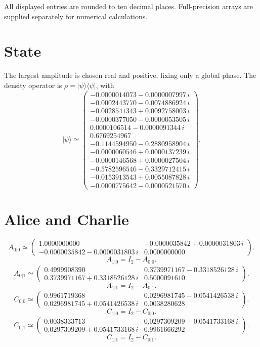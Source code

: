 \documentclass[11pt]{article}
\begin{document}
All displayed entries are rounded to ten decimal places. Full-precision
arrays are supplied separately for numerical calculations.
\section{State}
The largest amplitude is chosen real and positive, fixing only a global
phase. The density operator is $\rho=|\psi\rangle\langle\psi|$, with
\[
|\psi\rangle\simeq
\begin{pmatrix}
-0.0000014073-0.0000007997\,i \\
-0.0002443770-0.0074886924\,i \\
-0.0028541343+0.0092758003\,i \\
-0.0000377050-0.0000053505\,i \\
0.0000106514-0.0000091344\,i \\
0.6769254967 \\
-0.1144594950-0.2880958904\,i \\
-0.0000060546+0.0000137239\,i \\
-0.0000146568+0.0000027504\,i \\
-0.5782596546-0.3329712415\,i \\
-0.0153913543+0.0055087828\,i \\
-0.0000775642-0.0000521570\,i
\end{pmatrix}.
\]
\section{Alice and Charlie}
\[
A_{0|0}\simeq \begin{pmatrix}
1.0000000000 & -0.0000035842+0.0000031803\,i \\
-0.0000035842-0.0000031803\,i & 0.0000000000
\end{pmatrix}.
\]
\[
A_{1|0}=I_2-A_{0|0}.
\]
\[
A_{0|1}\simeq \begin{pmatrix}
0.4999908390 & 0.3739971167-0.3318526128\,i \\
0.3739971167+0.3318526128\,i & 0.5000091610
\end{pmatrix}.
\]
\[
A_{1|1}=I_2-A_{0|1}.
\]
\[
C_{0|0}\simeq \begin{pmatrix}
0.9961719368 & 0.0296981745-0.0541426538\,i \\
0.0296981745+0.0541426538\,i & 0.0038280628
\end{pmatrix}.
\]
\[
C_{1|0}=I_2-C_{0|0}.
\]
\[
C_{0|1}\simeq \begin{pmatrix}
0.0038333713 & 0.0297309209-0.0541733168\,i \\
0.0297309209+0.0541733168\,i & 0.9961666292
\end{pmatrix}.
\]
\[
C_{1|1}=I_2-C_{0|1}.
\]
\end{document}
